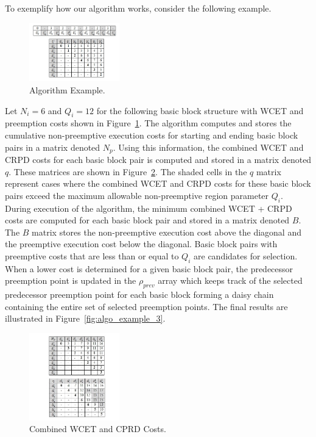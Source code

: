 To exemplify how our algorithm works, consider the following example.
\begin{figure}[h!]
\vspace{-10pt}
\begin{center}
\includegraphics[width=0.35\textwidth]{algo_example.jpg}
\caption{Algorithm Example.}
\label{fig:algo_example}
\end{center}
\vspace{-10pt}
\end{figure}
Let $N_i=6$ and $Q_i=12$ for the following basic block structure with WCET and preemption costs shown in Figure~\ref{fig:algo_example}.  The algorithm computes and stores the cumulative non-preemptive execution costs for starting and ending basic block pairs in a matrix denoted $N_p$.  Using this information, the combined WCET and CRPD costs for each basic block pair is computed and stored in a matrix denoted $q$.  These matrices are shown in Figure~\ref{fig:algo_example_2}.  The shaded cells in the $q$ matrix represent cases where the combined WCET and CRPD costs for these basic block pairs exceed the maximum allowable non-preemptive region parameter $Q_i$.  During execution of the algorithm, the minimum combined WCET + CRPD costs are computed for each basic block pair and stored in a matrix denoted $B$.  The $B$ matrix stores the non-preemptive execution cost above the diagonal and the preemptive execution cost below the diagonal.  Basic block pairs with preemptive costs that are less than or equal to $Q_i$ are candidates for selection.  When a lower cost is determined for a given basic block pair, the predecessor preemption point is updated in the $\rho_{prev}$ array which keeps track of the selected predecessor preemption point for each basic block forming a daisy chain containing the entire set of selected preemption points.  The final results are illustrated in Figure~\ref{fig:algo_example_3}.
\begin{figure}[h!]
\vspace{-10pt}
\begin{center}
\includegraphics[width=0.35\textwidth]{algo_example_2.jpg}
\caption{Combined WCET and CPRD Costs.}
\label{fig:algo_example_2}
\end{center}
\vspace{-10pt}
\end{figure}
